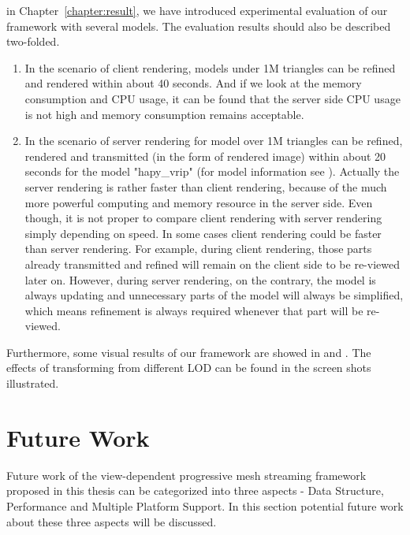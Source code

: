 in Chapter~\ref{chapter:result}, we have introduced experimental evaluation of our framework with several models. The evaluation results should also be described two-folded. 
\begin{enumerate}
\item
In the scenario of client rendering, models under 1M triangles can be refined and rendered within about 40 seconds. And if we look at the memory consumption and CPU usage, it can be found that the server side CPU usage is not high and memory consumption remains acceptable. 

\item
In the scenario of server rendering for model over 1M triangles can be refined, rendered and transmitted (in the form of rendered image) within about 20 seconds for the model "hapy\_vrip" (for model information see ). Actually the server rendering is rather faster than client rendering, because of the much more powerful computing and memory resource in the server side. Even though, it is not proper to compare client rendering with server rendering simply depending on speed. In some cases client rendering could be faster than server rendering. For example, during client rendering, those parts already transmitted and refined will remain on the client side to be re-viewed later on. However, during server rendering, on the contrary, the model is always updating and unnecessary parts of the model will always be simplified, which means refinement is always required whenever that part will be re-viewed. 

\end{enumerate}

Furthermore, some visual results of our framework are showed in  and . The effects of transforming from different LOD can be found in the screen shots illustrated. 


\section{Future Work}
\label{section:future work}
Future work of the view-dependent progressive mesh streaming framework proposed in this thesis can be categorized into three aspects -  Data Structure, Performance and Multiple Platform Support. In this section potential future work about these three aspects will be discussed. 

